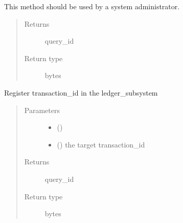 \documentclass[letterpaper,10pt,english]{sphinxmanual}
\begin{document}
\begin{fulllineitems}
\begin{fulllineitems}
This method should be used by a system administrator.
\begin{quote}\begin{description}
\item[{Returns}] \leavevmode
query\_id

\item[{Return type}] \leavevmode
bytes

\end{description}\end{quote}

\end{fulllineitems}


\begin{fulllineitems}
\label{\detokenize{bbc1.core.bbc_app:bbc1.core.bbc_app.BBcAppClient.receiver_loop}}
\end{fulllineitems}


\begin{fulllineitems}
\label{\detokenize{bbc1.core.bbc_app:bbc1.core.bbc_app.BBcAppClient.register_in_ledger_subsystem}}
Register transaction\_id in the ledger\_subsystem
\begin{quote}\begin{description}
\item[{Parameters}] \leavevmode\begin{itemize}
\item {} 
 () \textendash{} 

\item {} 
 () \textendash{} the target transaction\_id

\end{itemize}

\item[{Returns}] \leavevmode
query\_id

\item[{Return type}] \leavevmode
bytes


\end{description}
\end{quote}
\end{fulllineitems}
\end{fulllineitems}
\end{document}
